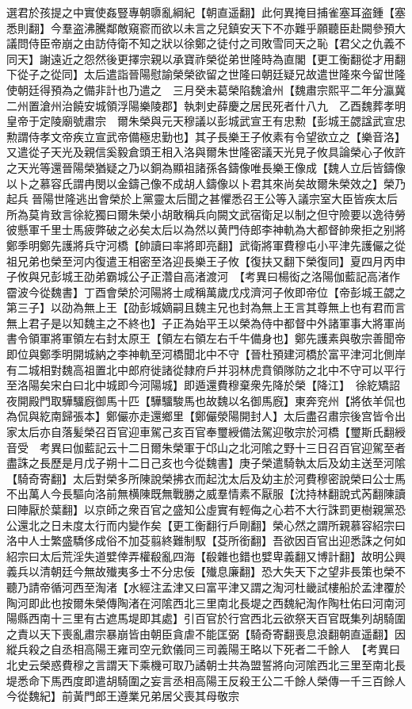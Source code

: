 選君於孩提之中實使姦豎專朝隳亂綱紀【朝直遥翻】此何異掩目捕雀塞耳盗鍾【塞悉則翻】今羣盗沸騰鄰敵窺窬而欲以未言之兒鎮安天下不亦難乎願聽臣赴闕參預大議問侍臣帝崩之由訪侍衛不知之狀以徐鄭之徒付之司敗雪同天之恥【君父之仇義不同天】謝遠近之怨然後更擇宗親以承寶祚榮從弟世隆時為直閣【更工衡翻從才用翻下從子之從同】太后遣詣晉陽慰諭榮榮欲留之世隆曰朝廷疑兄故遣世隆來今留世隆使朝廷得預為之備非計也乃遣之　三月癸未葛榮陷魏滄州【魏肅宗熙平二年分瀛冀二州置滄州治饒安城領浮陽樂陵郡】執刺史薛慶之居民死者什八九　乙酉魏葬孝明皇帝于定陵廟號肅宗　爾朱榮與元天穆議以彭城武宣王有忠勲【彭城王勰諡武宣忠勲謂侍孝文帝疾立宣武帝備極忠勤也】其子長樂王子攸素有令望欲立之【樂音洛】又遣從子天光及親信奚毅倉頭王相入洛與爾朱世隆密議天光見子攸具論榮心子攸許之天光等還晉陽榮猶疑之乃以銅為顯祖諸孫各鑄像唯長樂王像成【魏人立后皆鑄像以卜之慕容氏謂冉閔以金鑄己像不成胡人鑄像以卜君其來尚矣故爾朱榮效之】榮乃起兵晉陽世隆逃出會榮於上黨靈太后聞之甚懼悉召王公等入議宗室大臣皆疾太后所為莫肯致言徐紇獨曰爾朱榮小胡敢稱兵向闕文武宿衛足以制之但守險要以逸待勞彼懸軍千里士馬疲弊破之必矣太后以為然以黄門侍郎李神軌為大都督帥衆拒之别將鄭季明鄭先護將兵守河橋【帥讀曰率將即亮翻】武衛將軍費穆屯小平津先護儼之從祖兄弟也榮至河内復遣王相密至洛迎長樂王子攸【復扶又翻下榮復同】夏四月丙申子攸與兄彭城王劭弟霸城公子正濳自高渚渡河　【考異曰楊衒之洛陽伽藍記高渚作霤波今從魏書】丁酉會榮於河陽將士咸稱萬歲戊戍濟河子攸即帝位【帝彭城王勰之第三子】以劭為無上王【劭彭城嫡嗣且魏主兄也封為無上王言其尊無上也有君而言無上君子是以知魏主之不終也】子正為始平王以榮為侍中都督中外諸軍事大將軍尚書令領軍將軍領左右封太原王【領左右領左右千牛備身也】鄭先護素與敬宗善聞帝即位與鄭季明開城納之李神軌至河橋聞北中不守【晉杜預建河橋於富平津河北側岸有二城相對魏高祖置北中郎府徙諸從隸府戶并羽林虎賁領隊防之北中不守可以平行至洛陽矣宋白曰北中城即今河陽城】即遁還費穆棄衆先降於榮【降江】　徐紇矯詔夜開殿門取驊驑廐御馬十匹【驊驑駿馬也故魏以名御馬廐】東奔兖州【將依羊侃也為侃與紇南歸張本】鄭儼亦走還鄉里【鄭儼滎陽開封人】太后盡召肅宗後宫皆令出家太后亦自落髪榮召百官迎車駕己亥百官奉璽綬備法駕迎敬宗於河橋【璽斯氏翻綬音受　考異曰伽藍記云十二日爾朱榮軍于邙山之北河隂之野十三日召百官迎駕至者盡誅之長歷是月戊子朔十二日己亥也今從魏書】庚子榮遣騎執太后及幼主送至河隂【騎奇寄翻】太后對榮多所陳說榮拂衣而起沈太后及幼主於河費穆密說榮曰公士馬不出萬人今長驅向洛前無横陳既無戰勝之威羣情素不厭服【沈持林翻說式芮翻陳讀曰陣厭於葉翻】以京師之衆百官之盛知公虛實有輕侮之心若不大行誅罰更樹親黨恐公還北之日未度太行而内變作矣【更工衡翻行戶剛翻】榮心然之謂所親慕容紹宗曰洛中人士繁盛驕侈成俗不加芟翦終難制馭【芟所銜翻】吾欲因百官出迎悉誅之何如紹宗曰太后荒淫失道嬖倖弄權殽亂四海【殽雜也錯也嬖卑義翻又博計翻】故明公興義兵以清朝廷今無故殱夷多士不分忠佞【殱息廉翻】恐大失天下之望非長策也榮不聽乃請帝循河西至淘渚【水經注孟津又曰富平津又謂之淘河杜畿試樓船於孟津覆於陶河即此也按爾朱榮傳陶渚在河隂西北三里南北長堤之西魏紀淘作陶杜佑曰河南河陽縣西南十三里有古遮馬堤即其處】引百官於行宫西北云欲祭天百官既集列胡騎圍之責以天下喪亂肅宗暴崩皆由朝臣貪虐不能匡弼【騎奇寄翻喪息浪翻朝直遥翻】因縱兵殺之自丞相高陽王雍司空元欽儀同三司義陽王略以下死者二千餘人　【考異曰北史云榮惑費穆之言謂天下乘機可取乃譎朝士共為盟誓將向河隂西北三里至南北長堤悉命下馬西度即遣胡騎圍之妄言丞相高陽王反殺王公二千餘人榮傳一千三百餘人今從魏紀】前黃門郎王遵業兄弟居父喪其母敬宗